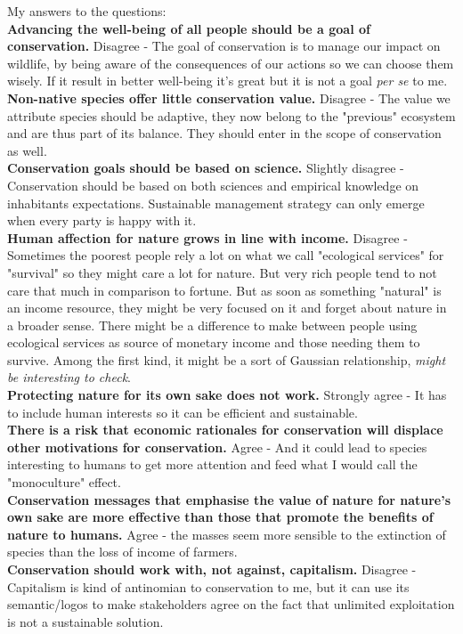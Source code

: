\documentclass[12pt]{article}
\begin{document}
My answers to the questions:\\
\textbf{Advancing the well-being of all people should be a goal of conservation.} Disagree - The goal of conservation is to manage our impact on wildlife, by being aware of the consequences of our actions so we can choose them wisely. If it result in better well-being it's great but it is not a goal \textit{per se} to me.\\
\textbf{Non-native species offer little conservation value.} Disagree - The value we attribute species should be adaptive, they now belong to the "previous" ecosystem and are thus part of its balance. They should enter in the scope of conservation as well.\\
\textbf{Conservation goals should be based on science.} Slightly disagree - Conservation should be based on both sciences and empirical knowledge on inhabitants expectations. Sustainable management strategy can only emerge when every party is happy with it.\\
\textbf{Human affection for nature grows in line with income.} Disagree - Sometimes the poorest people rely a lot on what we call "ecological services" for "survival" so they might care a lot for nature. But very rich people tend to not care that much in comparison to fortune. But as soon as something "natural" is an income resource, they might be very focused on it and forget about nature in a broader sense. There might be a difference to make between people using ecological services as source of monetary income and those needing them to survive. Among the first kind, it might be a sort of Gaussian relationship, \textit{might be interesting to check}.\\
\textbf{Protecting nature for its own sake does not work.} Strongly agree - It has to include human interests so it can be efficient and sustainable.\\
\textbf{There is a risk that economic rationales for conservation will displace other motivations for conservation.} Agree - And it could lead to species interesting to humans to get more attention and feed what I would call the "monoculture" effect.\\
\textbf{Conservation messages that emphasise the value of nature for nature's own sake are more effective than those that promote the benefits of nature to humans.} Agree - the masses seem more sensible to the extinction of species than the loss of income of farmers.\\
\textbf{Conservation should work with, not against, capitalism.} Disagree - Capitalism is kind of antinomian to conservation to me, but it can use its semantic/logos to make stakeholders agree on the fact that unlimited exploitation is not a sustainable solution.\\
\end{document}

